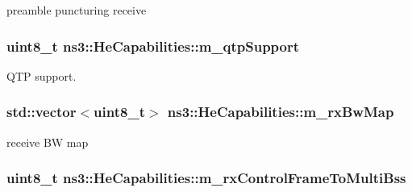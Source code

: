 preamble puncturing receive 

\subsubsection[{\texorpdfstring{m\+\_\+qtp\+Support}{m_qtpSupport}}]{\setlength{\rightskip}{0pt plus 5cm}uint8\+\_\+t ns3\+::\+He\+Capabilities\+::m\+\_\+qtp\+Support\hspace{0.3cm}{\ttfamily [private]}}\hypertarget{classns3_1_1HeCapabilities_a268e8e63f787d19048635296251f9897}{}\label{classns3_1_1HeCapabilities_a268e8e63f787d19048635296251f9897}


Q\+TP support. 

\subsubsection[{\texorpdfstring{m\+\_\+rx\+Bw\+Map}{m_rxBwMap}}]{\setlength{\rightskip}{0pt plus 5cm}std\+::vector$<$uint8\+\_\+t$>$ ns3\+::\+He\+Capabilities\+::m\+\_\+rx\+Bw\+Map\hspace{0.3cm}{\ttfamily [private]}}\hypertarget{classns3_1_1HeCapabilities_a59be329f6c16d697e891f1fabc51e37f}{}\label{classns3_1_1HeCapabilities_a59be329f6c16d697e891f1fabc51e37f}


receive BW map 

\subsubsection[{\texorpdfstring{m\+\_\+rx\+Control\+Frame\+To\+Multi\+Bss}{m_rxControlFrameToMultiBss}}]{\setlength{\rightskip}{0pt plus 5cm}uint8\+\_\+t ns3\+::\+He\+Capabilities\+::m\+\_\+rx\+Control\+Frame\+To\+Multi\+Bss\hspace{0.3cm}{\ttfamily [private]}}\hypertarget{classns3_1_1HeCapabilities_a0cf731328abb02e55a281add6e05a6b8}{}\label{classns3_1_1HeCapabilities_a0cf731328abb02e55a281add6e05a6b8}


